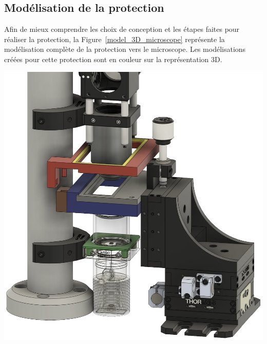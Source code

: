 \subsection{Modélisation de la protection}
\begin{minipage}[c]{0.38\textwidth}
    Afin de mieux comprendre les choix de conception et les étapes faites pour réaliser la protection, la Figure~\ref{model_3D_microscope} représente la modélisation complète de la protection vers le microscope. Les modélisations créées pour cette protection sont en couleur sur la représentation 3D.
\end{minipage}\hfill
\begin{minipage}[c]{0.58\textwidth}
    \begin{center}
        \includegraphics[width=\textwidth]{assets/figures/Protections_laser/Securite_mecanique/Protection_vers_microscope/model_3D.jpeg}
    \end{center}
    \label{model_3D_microscope}
\end{minipage}




